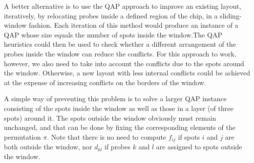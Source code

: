 A better alternative is to use the QAP approach to improve an existing layout,
iteratively, by relocating probes inside a defined region of the chip, in a
sliding-window fashion. Each iteration of this method would produce an instance
of a QAP whose size equals the number of spots inside the window.The QAP
heuristics could then be used to check whether a different arrangement of the
probes inside the window can reduce the conflicts. For this approach to work,
however, we also need to take into account the conflicts due to the spots around
the window. Otherwise, a new layout with less internal conflicts could be
achieved at the expense of increasing conflicts on the borders of the window.

A simple way of preventing this problem is to solve a larger QAP instance
consisting of the spots inside the window as well as those in a layer (of three
spots) around it. The spots outside the window obviously must remain unchanged,
and that can be done by fixing the corresponding elements of the permutation
$\pi$. Note that there is no need to compute $f_{ij}$ if spots $i$ and $j$ are
both outside the window, nor $d_{kl}$ if probes $k$ and $l$ are assigned to
spots outside the window.

